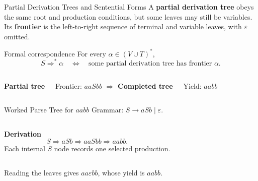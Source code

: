 \documentclass[10pt]{beamer}
\begin{document}
\begin{frame}{Partial Derivation Trees and Sentential Forms}
  \small
  A \textbf{partial derivation tree} obeys the same root and production
  conditions, but some leaves may still be variables. Its
  \textbf{frontier} is the left-to-right sequence of terminal and variable
  leaves, with $\varepsilon$ omitted.
  \begin{block}{Formal correspondence}
    For every $\alpha\in(V\cup T)^*$,
    \[
      S\Rightarrow^*\alpha
      \quad\Longleftrightarrow\quad
      \text{some partial derivation tree has frontier }\alpha.
    \]
  \end{block}
  \begin{columns}[T]
    \centering\textbf{Partial tree}


    Frontier: $aaSbb$
    \centering
    \vspace{1.1cm}
    $\Longrightarrow$
    \centering\textbf{Completed tree}


    Yield: $aabb$
  \end{columns}
\end{frame}

\begin{frame}{Worked Parse Tree for $aabb$}
  Grammar: $S\to aSb\mid\varepsilon$.
  \begin{columns}[T]
    \textbf{Derivation}
    \[
      S\Rightarrow aSb
       \Rightarrow aaSbb
       \Rightarrow aabb.
    \]
    Each internal $S$ node records one selected production.

    \centering
  \end{columns}
  \vspace{0.25cm}
  Reading the leaves gives $aa\varepsilon bb$, whose yield is $aabb$.
\end{frame}
\end{document}
